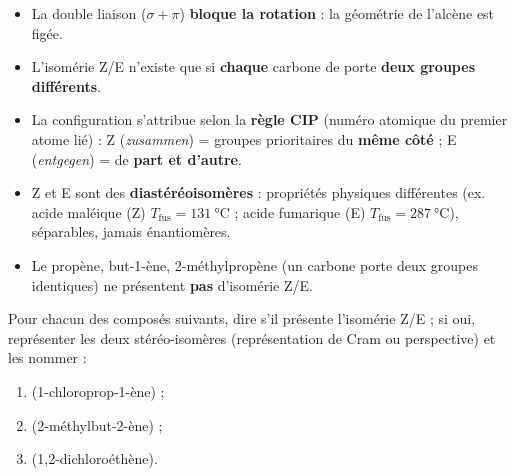 \documentclass[11pt]{article}
\newcommand{\cle}[1]{{\popxbold\color{popdark}#1}}
\begin{document}
\begin{aretenir}
\begin{itemize}
\item La double liaison  ($\sigma + \pi$) \textbf{bloque la rotation} : la géométrie de l'alcène est figée.
\item L'isomérie Z/E n'existe que si \textbf{chaque} carbone de  porte \textbf{deux groupes différents}.
\item La configuration s'attribue selon la \textbf{règle CIP} (numéro atomique du premier atome lié) : \cle{Z} (\emph{zusammen}) = groupes prioritaires du \textbf{même côté} ; \cle{E} (\emph{entgegen}) = de \textbf{part et d'autre}.
\item Z et E sont des \textbf{diastéréoisomères} : propriétés physiques différentes (ex. acide maléique (Z) $T_{\text{fus}} = \SI{131}{\celsius}$ ; acide fumarique (E) $T_{\text{fus}} = \SI{287}{\celsius}$), séparables, jamais énantiomères.
\item Le propène, but-1-ène, 2-méthylpropène (un carbone porte deux groupes identiques) ne présentent \textbf{pas} d'isomérie Z/E.
\end{itemize}
\end{aretenir}

\begin{exercice}
Pour chacun des composés suivants, dire s'il présente l'isomérie Z/E ; si oui, représenter les deux stéréo-isomères (représentation de Cram ou perspective) et les nommer :
\begin{enumerate}
\item {} (1-chloroprop-1-ène) ;
\item {} (2-méthylbut-2-ène) ;
\item {} (1,2-dichloroéthène).
\end{enumerate}
\end{exercice}
\end{document}
